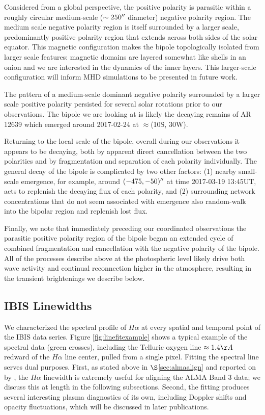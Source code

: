 \documentclass[twocolumn]{aastex62}
\newcommand{\secref}[1]{$\S$\ref{#1}}
\newcommand{\halpha}{\ensuremath{H\alpha}}
\begin{document}
Considered from a global perspective, the positive polarity is parasitic within a roughly circular medium-scale ($\sim250\mbox{$^{\prime\prime}$}{}$ diameter) negative polarity region. 
The medium scale negative polarity region is itself surrounded by a larger scale, predominantly positive polarity region that extends across both sides of the solar equator.
This magnetic configuration makes the bipole topologically isolated from larger scale features: magnetic domains are layered somewhat like shells in an onion and we are interested in the dynamics of the inner layers.
This larger-scale configuration will inform MHD simulations to be presented in future work.

The pattern of a medium-scale dominant negative polarity surrounded by a larger scale positive polarity persisted for several solar rotations prior to our observations.
The bipole we are looking at is likely the decaying remains of AR 12639 which emerged around 2017-02-24 at $\approx$(10S, 30W).

Returning to the local scale of the bipole, overall during our observations it appears to be decaying, both by apparent direct cancellation between the two polarities and by fragmentation and separation of each polarity individually.
The general decay of the bipole is complicated by two other factors: (1) nearby small-scale emergence, for example, around $(-475,-50)\mbox{$^{\prime\prime}$}{}$ at time 2017-03-19 13:45UT, acts to replenish the decaying flux of each polarity, and (2) surrounding network concentrations that do not seem associated with emergence also random-walk into the bipolar region and replenish lost flux.

Finally, we note that immediately preceding our coordinated observations the parasitic positive polarity region of the bipole began an extended cycle of combined fragmentation and cancellation with the negative polarity of the bipole.
All of the processes describe above at the photospheric level likely drive both wave activity and continual reconnection higher in the atmosphere, resulting in the transient brightenings we describe below.

\subsection{IBIS Linewidths}
\label{sec:linewidth}
We characterized the spectral profile of \halpha{} at every spatial and temporal point of the IBIS data series.
Figure \ref{fig:linefitexample} shows a typical example of the spectral data (green crosses), including the Telluric oxygen line $\approx1.4\AA{}$ redward of the \halpha{} line center, pulled from a single pixel.
Fitting the spectral line serves dual purposes.
First, as stated above in \secref{sec:almaalign} and reported on by \citet{2019Molnar}, the \halpha{} linewidth is extremely useful for aligning the ALMA Band 3 data; we discuss this at length in the following subsections.
Second, the fitting produces several interesting plasma diagnostics of its own, including Doppler shifts and opacity fluctuations, which will be discussed in later publications.
\end{document}
